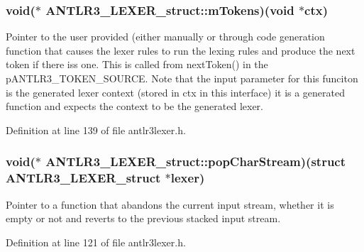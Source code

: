 \hypertarget{struct_a_n_t_l_r3___l_e_x_e_r__struct_af9c91981f78a7d27002934024b024fc0}{
\subsubsection[{m\-Tokens}]{\setlength{\rightskip}{0pt plus 5cm}void($\ast$ A\-N\-T\-L\-R3\-\_\-\-L\-E\-X\-E\-R\-\_\-struct\-::m\-Tokens)(void $\ast${\bf ctx})}}\label{struct_a_n_t_l_r3___l_e_x_e_r__struct_af9c91981f78a7d27002934024b024fc0}
Pointer to the user provided (either manually or through code generation function that causes the lexer rules to run the lexing rules and produce the next token if there iss one. This is called from next\-Token() in the p\-A\-N\-T\-L\-R3\-\_\-\-T\-O\-K\-E\-N\-\_\-\-S\-O\-U\-R\-C\-E. Note that the input parameter for this funciton is the generated lexer context (stored in ctx in this interface) it is a generated function and expects the context to be the generated lexer. 

Definition at line 139 of file antlr3lexer.\-h.

\hypertarget{struct_a_n_t_l_r3___l_e_x_e_r__struct_af3f03678a1511675104bc37ada7dcade}{
\subsubsection[{pop\-Char\-Stream}]{\setlength{\rightskip}{0pt plus 5cm}void($\ast$ A\-N\-T\-L\-R3\-\_\-\-L\-E\-X\-E\-R\-\_\-struct\-::pop\-Char\-Stream)(struct {\bf A\-N\-T\-L\-R3\-\_\-\-L\-E\-X\-E\-R\-\_\-struct} $\ast$lexer)}}\label{struct_a_n_t_l_r3___l_e_x_e_r__struct_af3f03678a1511675104bc37ada7dcade}
Pointer to a function that abandons the current input stream, whether it is empty or not and reverts to the previous stacked input stream. 

Definition at line 121 of file antlr3lexer.\-h.

